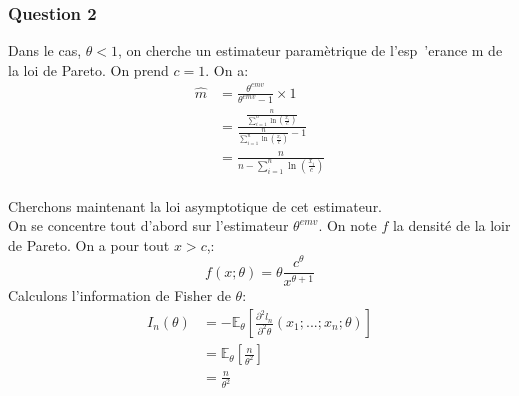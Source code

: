 \documentclass[a4paper,11pt]{article}
\theoremstyle{remark}
\begin{document}
\subsubsection*{Question 2}
Dans le cas, $\theta < 1$, on cherche un estimateur param\`etrique de l'esp\ 'erance m de la loi de Pareto. On prend $c=1$. On a:
\begin{align*}
\hat{m} &= \frac{\theta ^{emv}}{\theta ^{emv}-1}\times 1\\
		&= \frac{\frac{n}{\sum_{i=1}^{n}\ln(\frac{x_{i}}{c})}}{\frac{n}{\sum_{i=1}^{n}\ln(\frac{x_{i}}{c})} -1}\\
		&= \frac{n}{n-\sum_{i=1}^{n}\ln(\frac{x_{i}}{c})}
\end{align*}
\\
Cherchons maintenant la loi asymptotique de cet estimateur.\\
On se concentre tout d'abord sur l'estimateur $\theta ^{emv}$. On note $f$ la densit\'e de la loir de Pareto. On a pour tout $x>c$,:
$$f(x;\theta)=\theta\frac{c^{\theta}}{x^{\theta+1}}$$
Calculons l'information de Fisher de $\theta$:
\begin{align*}
I_{n}(\theta)&= - \mathbb{E}_{\theta}[\frac{\partial^{2} l_{n}}{\partial^{2} \theta}(x_{1};...;x_{n};\theta)]\\
		&= \mathbb{E}_{\theta}[\frac{n}{\theta^{2}}]\\
		&= \frac{n}{\theta^{2}}
\end{align*}
\end{document}
